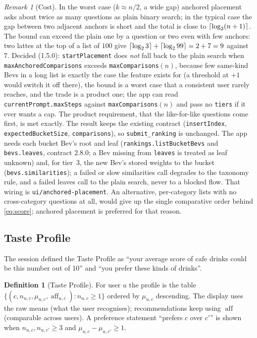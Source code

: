 \documentclass[11pt]{article}
\DeclarePairedDelimiter\ceil{\lceil}{\rceil}
\DeclareMathOperator{\aff}{aff}
\newcommand{\code}[1]{\texttt{#1}}
\theoremstyle{plain}
\theoremstyle{definition}
\newtheorem{definition}[theorem]{Definition}
\theoremstyle{remark}
\newtheorem{remark}[theorem]{Remark}
\begin{document}
\begin{remark}[Cost]\label{rem:cost}
In the worst case ($k \approx n/2$, a wide gap) anchored placement asks about twice as many questions as plain binary search; in the typical case the gap between two adjacent anchors is short and the total is close to $\ceil{\log_2(n+1)}$. The bound can exceed the plain one by a question or two even with few anchors: two lattes at the top of a list of $100$ give $\ceil{\log_2 3} + \ceil{\log_2 99} = 2 + 7 = 9$ against $7$. Decided (1.5.0): \code{startPlacement} does \emph{not} fall back to the plain search when \code{maxAnchoredComparisons} exceeds \code{maxComparisons}$(n)$, because few same-kind Bevs in a long list is exactly the case the feature exists for (a threshold at $+1$ would switch it off there), the bound is a worst case that a consistent user rarely reaches, and the trade is a product one; the app can read \code{currentPrompt.maxSteps} against \code{maxComparisons}$(n)$ and pass no \code{tiers} if it ever wants a cap. The product requirement, that the like-for-like questions come first, is met exactly. The result keeps the existing contract (\code{insertIndex}, \code{expectedBucketSize}, \code{comparisons}), so \code{submit\_ranking} is unchanged. The app needs each bucket Bev's root and leaf (\code{rankings.listBucketBevs} and \code{bevs.leaves}, contract 2.8.0; a Bev missing from \code{leaves} is treated as leaf unknown) and, for tier~3, the new Bev's stored weights to the bucket (\code{bevs.similarities}); a failed or slow similarities call degrades to the taxonomy rule, and a failed leaves call to the plain search, never to a blocked flow. That wiring is \code{ui/anchored-placement}. An alternative, per-category lists with no cross-category questions at all, would give up the single comparative order behind \eqref{eq:score}; anchored placement is preferred for that reason.
\end{remark}

\subsection{Taste Profile}\label{sec:taste}

The session defined the Taste Profile as ``your average score of cafe drinks could be this number out of 10'' and ``you prefer these kinds of drinks''.

\begin{definition}[Taste Profile]
For user $u$ the profile is the table $\{(c, n_{u,c}, \mu_{u,c}, \aff_{u,c}) : n_{u,c} \ge 1\}$ ordered by $\mu_{u,c}$ descending. The display uses the raw means (what the user recognises); recommendations keep using $\aff$ (comparable across users). A preference statement ``prefers $c$ over $c'$'' is shown when $n_{u,c}, n_{u,c'} \ge 3$ and $\mu_{u,c} - \mu_{u,c'} \ge 1$.
\end{definition}
\end{document}
